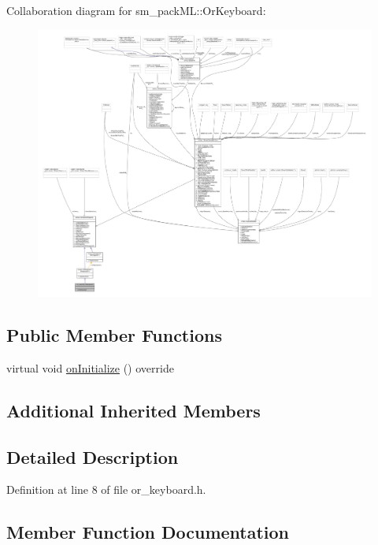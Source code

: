 Collaboration diagram for sm\+\_\+pack\+ML\+:\+:Or\+Keyboard\+:
\nopagebreak
\begin{figure}[H]
\begin{center}
\leavevmode
\includegraphics[width=350pt]{classsm__packML_1_1OrKeyboard__coll__graph}
\end{center}
\end{figure}
\subsection*{Public Member Functions}
\begin{DoxyCompactItemize}
\item 
virtual void \hyperlink{classsm__packML_1_1OrKeyboard_a4bdd03a6423e97af795d191d636082b6}{on\+Initialize} () override
\end{DoxyCompactItemize}
\subsection*{Additional Inherited Members}


\subsection{Detailed Description}


Definition at line 8 of file or\+\_\+keyboard.\+h.



\subsection{Member Function Documentation}
\mbox{\label{classsm__packML_1_1OrKeyboard_a4bdd03a6423e97af795d191d636082b6}} 
